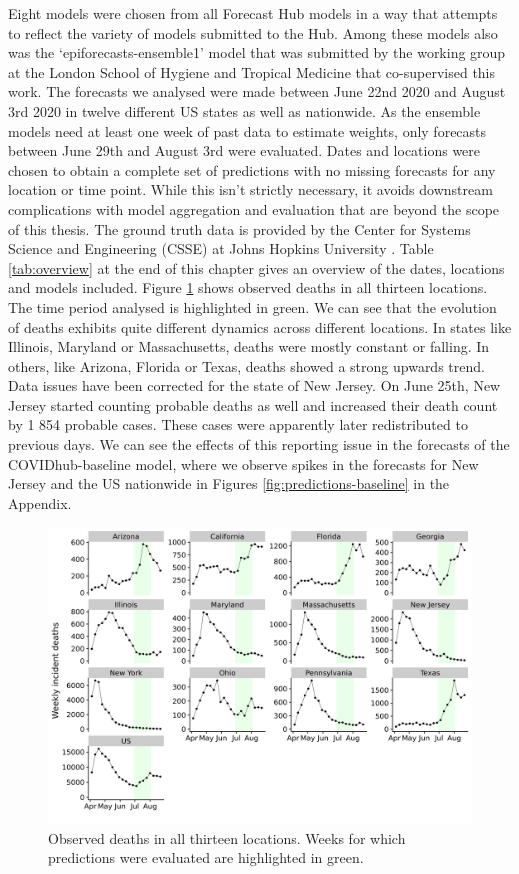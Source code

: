 \documentclass[
]{book}
\begin{document}
Eight models were chosen from all Forecast Hub models in a way that attempts to reflect the variety of models submitted to the Hub. Among these models also was the `epiforecasts-ensemble1' model that was submitted by the working group at the London School of Hygiene and Tropical Medicine that co-supervised this work. The forecasts we analysed were made between June 22nd 2020 and August 3rd 2020 in twelve different US states as well as nationwide. As the ensemble models need at least one week of past data to estimate weights, only forecasts between June 29th and August 3rd were evaluated. Dates and locations were chosen to obtain a complete set of predictions with no missing forecasts for any location or time point. While this isn't strictly necessary, it avoids downstream complications with model aggregation and evaluation that are beyond the scope of this thesis.
The ground truth data is provided by the Center for Systems Science and Engineering (CSSE) at Johns Hopkins University \citep{dongInteractiveWebbasedDashboard2020}. Table \ref{tab:overview} at the end of this chapter gives an overview of the dates, locations and models included. Figure \ref{fig:us-data} shows observed deaths in all thirteen locations. The time period analysed is highlighted in green. We can see that the evolution of deaths exhibits quite different dynamics across different locations. In states like Illinois, Maryland or Massachusetts, deaths were mostly constant or falling. In others, like Arizona, Florida or Texas, deaths showed a strong upwards trend. Data issues have been corrected for the state of New Jersey. On June 25th, New Jersey started counting probable deaths as well and increased their death count by 1 854 probable cases. These cases were apparently later redistributed to previous days. We can see the effects of this reporting issue in the forecasts of the COVIDhub-baseline model, where we observe spikes in the forecasts for New Jersey and the US nationwide in Figures \ref{fig:predictions-baseline} in the Appendix.

\begin{figure}
\includegraphics[width=0.95\linewidth]{../visualisation/chapter-2-background-data/plot-observations} \caption{Observed deaths in all thirteen locations. Weeks for which predictions were evaluated are highlighted in green.}\label{fig:us-data}
\end{figure}
\end{document}
